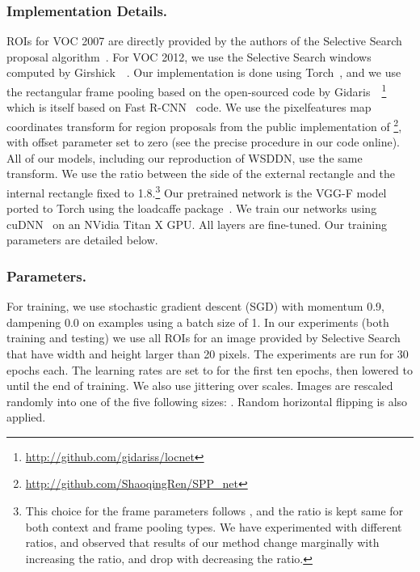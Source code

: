 \documentclass[runningheads]{llncs}
\begin{document}
\subsubsection{Implementation Details.}

ROIs for VOC 2007 are directly provided by the authors of the Selective
Search proposal algorithm~\cite{uijlings2013selective}. For VOC 2012, we use the Selective Search windows computed by Girshick~\etal~\cite{Girshick_2015_ICCV}.
Our implementation is done using Torch~\cite{collobert2011torch7}, and we use the
rectangular frame pooling based on the open-sourced code by Gidaris~\etal~\cite{DBLP:journals/corr/GidarisK15a,Gidaris_2015_ICCV}\footnote{\url{http://github.com/gidariss/locnet}} which 
is itself based on Fast R-CNN~\cite{Girshick_2015_ICCV} code.  
We use the pixelfeatures map coordinates transform for 
region proposals from the public implementation of \cite{He:2014wg}\footnote{\url{http://github.com/ShaoqingRen/SPP_net}}, 
with offset parameter set to zero (see the precise procedure in our code online\footnotemark[1]).
All of our models, including our reproduction of WSDDN, use the same transform. 
We use the  ratio between the side of the external rectangle and the internal rectangle fixed to 1.8.\footnote{This choice for the frame parameters follows \cite{DBLP:journals/corr/GidarisK15a,Gidaris_2015_ICCV}, and the ratio is kept same for both context and frame pooling types. We have experimented with different ratios, and observed that results of our method change marginally with increasing the ratio, and drop with decreasing  the ratio.}
Our pretrained network is the VGG-F model~\cite{Chatfield14} ported to Torch using the loadcaffe
package~\cite{zagoruyko2015}.
We train our networks using cuDNN~\cite{chetlur2014cudnn} on an NVidia Titan
X GPU. All layers are fine-tuned. Our training parameters are detailed below.

\subsubsection{Parameters.}

For training, we use stochastic gradient descent (SGD) with momentum 0.9, dampening 0.0 on
examples using a batch size of 1. In our experiments (both training and testing) 
we use all ROIs for an image provided by Selective Search~\cite{uijlings2013selective} that have width and height larger than 20 pixels.
The experiments are run for 30 epochs each. The learning rates are set to
 for the first ten epochs, then lowered to 
until the end of training.
We also use jittering over scales. Images are rescaled randomly into one of the
five following sizes: . Random horizontal flipping is also applied. 
\end{document}
